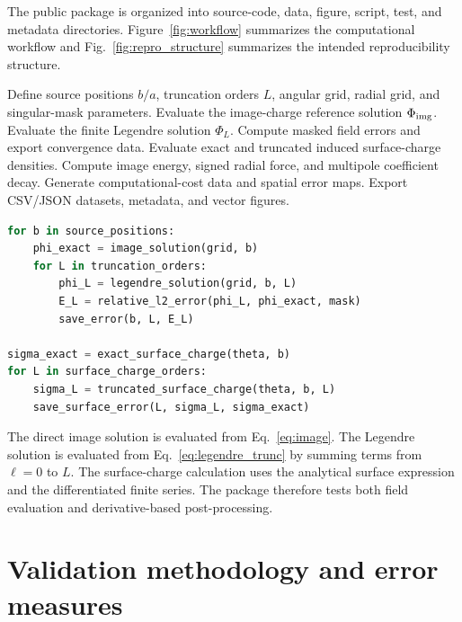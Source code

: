 \documentclass[preprint,12pt]{elsarticle}
\begin{document}
The public package is organized into source-code, data, figure, script, test, and metadata directories. Figure~\ref{fig:workflow} summarizes the computational workflow and Fig.~\ref{fig:repro_structure} summarizes the intended reproducibility structure.

\begin{algorithm}[t]
\caption{End-to-end reproduction workflow.}\label{alg:workflow}
\begin{algorithmic}[1]
\State Define source positions $b/a$, truncation orders $L$, angular grid, radial grid, and singular-mask parameters.
    \State Evaluate the image-charge reference solution $\Phi_{\rm img}$.
        \State Evaluate the finite Legendre solution $\Phi_L$.
        \State Compute masked field errors and export convergence data.
    \EndFor
    \State Evaluate exact and truncated induced surface-charge densities.
    \State Compute image energy, signed radial force, and multipole coefficient decay.
\EndFor
\State Generate computational-cost data and spatial error maps.
\State Export CSV/JSON datasets, metadata, and vector figures.
\end{algorithmic}
\end{algorithm}

\begin{lstlisting}[language=Python,caption={Minimal pseudocode representation of the solver loop.},label={lst:pseudocode}]
for b in source_positions:
    phi_exact = image_solution(grid, b)
    for L in truncation_orders:
        phi_L = legendre_solution(grid, b, L)
        E_L = relative_l2_error(phi_L, phi_exact, mask)
        save_error(b, L, E_L)

sigma_exact = exact_surface_charge(theta, b)
for L in surface_charge_orders:
    sigma_L = truncated_surface_charge(theta, b, L)
    save_surface_error(L, sigma_L, sigma_exact)
\end{lstlisting}

The direct image solution is evaluated from Eq.~\eqref{eq:image}. The Legendre solution is evaluated from Eq.~\eqref{eq:legendre_trunc} by summing terms from $\ell=0$ to $L$. The surface-charge calculation uses the analytical surface expression and the differentiated finite series. The package therefore tests both field evaluation and derivative-based post-processing.

\section{Validation methodology and error measures}\label{sec:errors}
\end{document}
